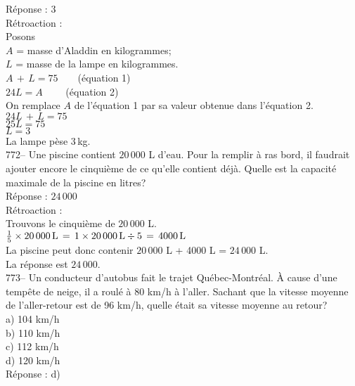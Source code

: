 ﻿\documentclass[letterpaper, 12pt]{article}
\begin{document}
R\'eponse : 3\\

R\'etroaction :\\
Posons\\
$A$ = masse d'Aladdin en kilogrammes; \\
$L$ = masse de la lampe en kilogrammes.\\

$A\,+\,L=75 \qquad $(\'equation 1)\\
$24L=A \qquad $ (\'equation 2)\\

On remplace $A$ de l'\'equation 1 par sa valeur obtenue dans l'\'equation
2.\\
$24L \,+\,L = 75$\\
$25L=75$\\
$L=3$\\
La lampe p\`ese 3\,kg.\\

772-- Une piscine contient $20\,000$ L d'eau.  Pour la remplir \`a ras bord,
il faudrait ajouter encore le cinqui\`eme de ce qu'elle contient d\'ej\`a.
Quelle est la capacit\'e maximale de la piscine en litres?\\

R\'eponse : $24\,000$ \\

R\'etroaction : \\
Trouvons le cinqui\`eme de $20\,000$ L.\\
$\frac{1}{5}\times 20\,000
\textrm{\,L}\,=\,1\times20\,000\,\textrm{L}\div5\,=\,4000\,\textrm{L}$\\
La piscine peut donc contenir $20\,000$ L + 4000 L = $24\,000$ L.\\
La r\'eponse est $24\,000$.\\

773-- Un conducteur d'autobus fait le trajet Qu\'ebec-Montr\'eal.  \`A cause
d'une temp\^ete de neige, il a roul\'e \`a 80 km/h \`a l'aller.  Sachant que
la vitesse moyenne de l'aller-retour est de 96 km/h, quelle \'etait sa
vitesse moyenne au retour?\\
a) 104 km/h\\
b) 110 km/h\\
c) 112 km/h\\
d) 120 km/h\\

R\'eponse : d)\\
\end{document}
